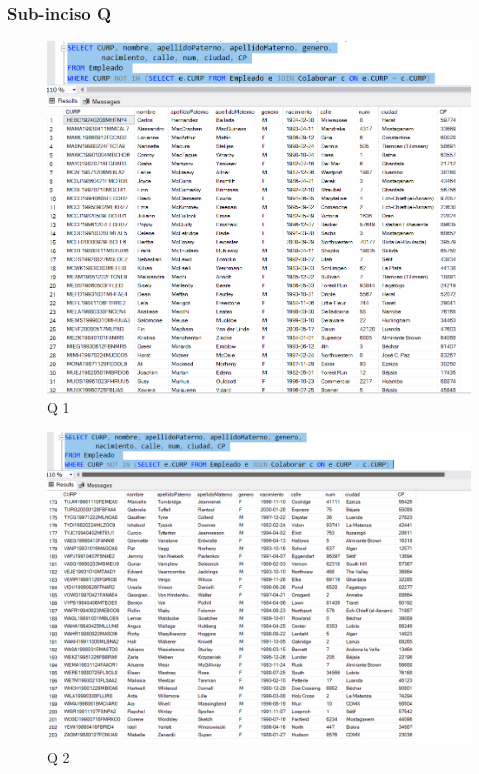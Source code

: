 \documentclass[a4paper, 12pt]{report}
\begin{document}
\subsubsection*{Sub-inciso Q}
    \begin{figure}
        \includegraphics[width=\textwidth]
            {img/Q1.png}\hfill
    \caption{Q 1}
    \end{figure}
    \begin{figure}
        \includegraphics[width=\textwidth]
            {img/Q2.png}\hfill
    \caption{Q 2}
    \end{figure}
\end{document}
